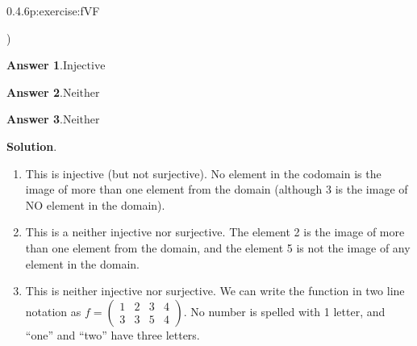 \documentclass[twoside,11pt,]{book}
\newcommand{\blocktitlefont}{\relax}
\numberwithin{equation}{chapter}
\newcommand{\twoline}[2]{\begin{pmatrix}#1 \\ #2 \end{pmatrix}}
\newcommand{\amp}{&}
\begin{document}
\begin{divisionsolution}{0.4.6}{}{p:exercise:fVF}
\begin{enumerate}[label=(\alph*)]
\begin{itemize*}[label=$\square$,leftmargin=3em,itemjoin=\hspace{1em}]
\end{itemize*})\quad
%
\end{enumerate}
%
\par\smallskip%
\noindent\textbf{\blocktitlefont Answer 1}.\quad{}\(\text{Injective}\)%
\par\smallskip%
\noindent\textbf{\blocktitlefont Answer 2}.\quad{}\(\text{Neither}\)%
\par\smallskip%
\noindent\textbf{\blocktitlefont Answer 3}.\quad{}\(\text{Neither}\)%
\par\smallskip%
\noindent\textbf{\blocktitlefont Solution}.\quad{}%
\begin{enumerate}[label=(\alph*)]
\item{}This is injective (but not surjective). No element in the codomain is the image of more than one element from the domain (although 3 is the image of NO element in the domain).%
\item{}This is a neither injective nor surjective. The element 2 is the image of more than one element from the domain, and the element 5 is not the image of any element in the domain.%
\item{}This is neither injective nor surjective. We can write the function in two line notation as \(f = \twoline{1 \amp 2 \amp 3 \amp 4}{3 \amp 3 \amp 5 \amp 4}\text{.}\) No number is spelled with 1 letter, and ``one'' and ``two'' have three letters.%
\end{enumerate}
%
\end{divisionsolution}%
\end{document}

